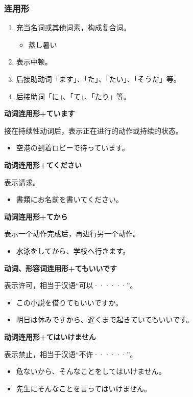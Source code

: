\subsubsection{连用形}%

\begin{enumerate}
  \item 充当名词或其他词素，构成复合词。
    \begin{itemize}
      \item 蒸し暑い
    \end{itemize}
  \item 表示中顿。
  \item 后接助动词「ます」、「た」、「たい」、「そうだ」等。
  \item 后接助词「に」、「て」、「たり」等。
\end{enumerate}

{\bf
\noindent 动词连用形+ています
}

接在持续性动词后，表示正在进行的动作或持续的状态。
\begin{itemize}
  \item 空港の到着ロビーで待っています。
\end{itemize}

{\bf
\noindent 动词连用形+てください
}

表示请求。
\begin{itemize}
  \item 書類にお名前を書いてください。
\end{itemize}

{\bf
\noindent 动词连用形+てから
}

表示一个动作完成后，再进行另一个动作。
\begin{itemize}
  \item 水泳をしてから、学校へ行きます。
\end{itemize}

{\bf
\noindent 动词、形容词连用形+てもいいです
}

表示许可，相当于汉语``可以······''。
\begin{itemize}
  \item この小説を借りてもいいですか。
  \item 明日は休みですから、遅くまで起きていてもいいです。
\end{itemize}

{\bf
\noindent 动词连用形+てはいけません
}

表示禁止，相当于汉语``不许······''。
\begin{itemize}
  \item 危ないから、そんなことをしてはいけません。
  \item 先生にそんなことを言ってはいけません。
\end{itemize}

